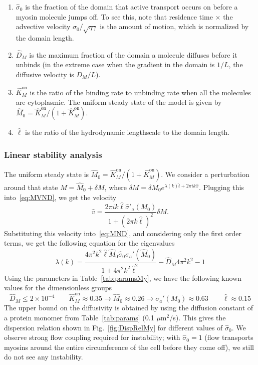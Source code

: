 \documentclass[11pt]{article}
\newcommand{\6}[1]{#1_{\text{6}}}
\newcommand{\3}[1]{#1_{\text{3}}}
\begin{document}
\begin{enumerate}
\item $\hat{\sigma}_0$ is the fraction of the domain that active transport occurs on before a myosin molecule jumps off. To see this, note that residence time $\times$ the advective velocity $\sigma_0 / \sqrt{\eta \gamma}$ is the amount of motion, which is normalized by the domain length.
\item $\hat{D}_M$ is the maximum fraction of the domain a molecule diffuses before it unbinds (in the extreme case when the gradient in the domain is $1/L$, the diffusive velocity is $D_M/L$). 
\item $\hat{K}^\text{on}_M$ is the ratio of the binding rate to unbinding rate when all the molecules are cytoplasmic. The uniform steady state of the model is given by $\hat{M}_0= \hat{K}^\text{on}_M/\left(1+\hat{K}^\text{on}_M\right)$.
\item $\hat{\ell}$ is the ratio of the hydrodynamic lengthscale to the domain length.
\end{enumerate}

\subsubsection{Linear stability analysis \label{sec:StabMy}}
The uniform steady state is $\hat{M}_0= \hat{K}^\text{on}_M/\left(1+\hat{K}^\text{on}_M\right)$. We consider a perturbation around that state $M=\hat{M}_0+\delta M$, where $\delta M = \delta M_0 e^{\lambda(k) \hat{t}+2 \pi i k \hat{x}}$. Plugging this into\ \eqref{eq:MVND}, we get the velocity \cite[Eq.~(11)]{bois2011pattern}
\begin{equation}
\hat v = \frac{2 \pi i k \hat{\ell} \hat{\sigma}'_a(M_0)}{1 + \left(2 \pi k \hat \ell\right)^2} \delta M. 
\end{equation}
Substituting this velocity into\ \eqref{eq:MND}, and considering only the first order terms, we get the following equation for the eigenvalues
\begin{equation}
\label{eq:DispRel}
\lambda(k) = \frac{4\pi^2 k^2 \hat{\ell} \hat{M}_0 \hat{\sigma}_0 \sigma_a'(\hat{M}_0)}{1+4\pi^2 k^2 \hat{\ell}^2} - \hat{D}_M 4 \pi^2 k^2 -1
\end{equation}
Using the parameters in Table\ \ref{tab:paramsMy}, we have the following known values for the dimensionless groups
\begin{equation}
\hat{D}_M \leq 2 \times 10^{-4} \qquad \hat{K}^\text{on}_M \approx 0.35 \rightarrow \hat{M}_0 \approx 0.26\rightarrow \sigma_a'(M_0) \approx 0.63 \qquad \hat{\ell} \approx 0.15
\end{equation}
The upper bound on the diffusivity is obtained by using the diffusion constant of a protein monomer from Table\ \ref{tab:params} (0.1 $\mu$m$^2$/s). This gives the dispersion relation shown in Fig.\ \ref{fig:DispRelMy} for different values of $\hat{\sigma}_0$. We observe strong flow coupling required for instability; with $\hat{\sigma}_0=1$ (flow transports myosins around the entire circumference of the cell before they come off), we still do not see any instability. 
\end{document}
